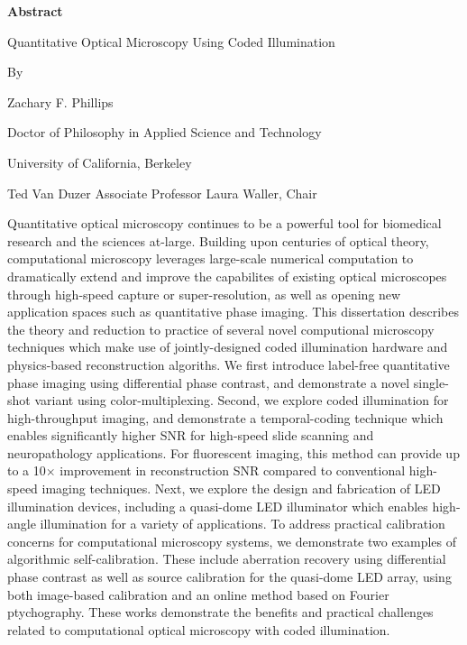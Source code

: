 \begin{center}
    \textbf{Abstract}

    \vspace{1.2cm}
     Quantitative Optical Microscopy Using Coded Illumination

    \vspace{0.4cm}

    By

    \vspace{0.4cm}
    Zachary F. Phillips

     \vspace{0.4cm}
     Doctor of Philosophy in Applied Science and Technology

     \vspace{0.4cm}
     University of California, Berkeley

     \vspace{0.4cm}
     Ted Van Duzer Associate Professor Laura Waller, Chair

    \vspace{0.8cm}


\end{center}

Quantitative optical microscopy continues to be a powerful tool for biomedical research and the sciences at-large. Building upon centuries of optical theory, computational microscopy leverages large-scale numerical computation to dramatically extend and improve the capabilites of existing optical microscopes through high-speed capture or super-resolution, as well as opening new application spaces such as quantitative phase imaging. This dissertation describes the theory and reduction to practice of several novel computional microscopy techniques which make use of jointly-designed coded illumination hardware and physics-based reconstruction algoriths. We first introduce label-free quantitative phase imaging using differential phase contrast, and demonstrate a novel single-shot variant using color-multiplexing. Second, we explore coded illumination for high-throughput imaging, and demonstrate a temporal-coding technique which enables significantly higher SNR for high-speed slide scanning and neuropathology applications. For fluorescent imaging, this method can provide up to a 10$\times$ improvement in reconstruction SNR compared to conventional high-speed imaging techniques. Next, we explore the design and fabrication of LED illumination devices, including a quasi-dome LED illuminator which enables high-angle illumination for a variety of applications. To address practical calibration concerns for computational microscopy systems, we demonstrate two examples of algorithmic self-calibration. These include aberration recovery using differential phase contrast as well as source calibration for the quasi-dome LED array, using both image-based calibration and an online method based on Fourier ptychography. These works demonstrate the benefits and practical challenges related to computational optical microscopy with coded illumination.
